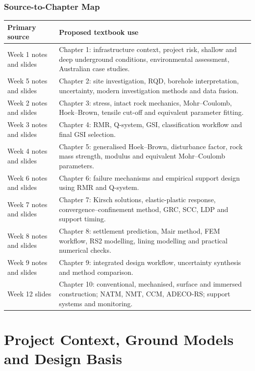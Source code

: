 \documentclass[12pt,oneside]{book}
\begin{document}
\section*{Source-to-Chapter Map}

\begin{longtable}{p{}p{}}
\toprule
\textbf{Primary source} & \textbf{Proposed textbook use} \\
\midrule
Week 1 notes and slides & Chapter 1: infrastructure context, project risk, shallow and deep underground conditions, environmental assessment, Australian case studies. \\
Week 5 notes and slides & Chapter 2: site investigation, RQD, borehole interpretation, uncertainty, modern investigation methods and data fusion. \\
Week 2 notes and slides & Chapter 3: stress, intact rock mechanics, Mohr--Coulomb, Hoek--Brown, tensile cut-off and equivalent parameter fitting. \\
Week 3 notes and slides & Chapter 4: RMR, Q-system, GSI, classification workflow and final GSI selection. \\
Week 4 notes and slides & Chapter 5: generalised Hoek--Brown, disturbance factor, rock mass strength, modulus and equivalent Mohr--Coulomb parameters. \\
Week 6 notes and slides & Chapter 6: failure mechanisms and empirical support design using RMR and Q-system. \\
Week 7 notes and slides & Chapter 7: Kirsch solutions, elastic-plastic response, convergence--confinement method, GRC, SCC, LDP and support timing. \\
Week 8 notes and slides & Chapter 8: settlement prediction, Mair method, FEM workflow, RS2 modelling, lining modelling and practical numerical checks. \\
Week 9 notes and slides & Chapter 9: integrated design workflow, uncertainty synthesis and method comparison. \\
Week 12 slides & Chapter 10: conventional, mechanised, surface and immersed construction; NATM, NMT, CCM, ADECO-RS; support systems and monitoring. \\
\bottomrule
\end{longtable}

\part{Project Context, Ground Models and Design Basis}
\end{document}

